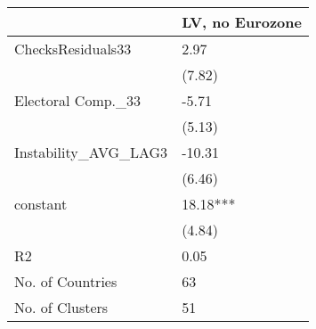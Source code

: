 \begin{tabular}{ll}
  \hline
 & LV, no Eurozone \\ 
  \hline
ChecksResiduals33 & 2.97 \\ 
   & (7.82) \\ 
  Electoral Comp.\_33 & -5.71 \\ 
   & (5.13) \\ 
  Instability\_AVG\_LAG3 & -10.31 \\ 
   & (6.46) \\ 
  constant & 18.18*** \\ 
   & (4.84) \\ 
  R2 & 0.05 \\ 
  No. of Countries & 63 \\ 
  No. of Clusters & 51 \\ 
   \hline
\end{tabular}
